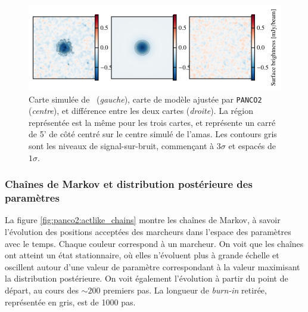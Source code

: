 \begin{figure}[t]
    \centering
    \includegraphics[width=\linewidth]{Figures/Chap_panco/demo_plots/data_model_residuals.pdf}
    \caption{
        Carte simulée de \act\ (\textit{gauche}), carte de modèle ajustée par \texttt{PANCO2} (\textit{centre}), et différence entre les deux cartes (\textit{droite}).
        La région représentée est la même pour les trois cartes, et représente un carré de 5' de côté centré sur le centre simulé de l'amas.
        Les contours gris sont les niveaux de signal-sur-bruit, commençant à $3\sigma$ et espacés de $1\sigma$.
    }
    \label{fig:panco2:actlike_dmr}
\end{figure}

\subsubsection{Chaînes de Markov et distribution postérieure des paramètres} %
La figure \ref{fig:panco2:actlike_chains} montre les chaînes de Markov, à savoir l'évolution des positions acceptées des marcheurs dans l'espace des paramètres avec le temps.
Chaque couleur correspond à un marcheur.
On voit que les chaînes ont atteint un état stationnaire, où elles n'évoluent plus à grande échelle et oscillent autour d'une valeur de paramètre correspondant à la valeur maximisant la distribution postérieure.
On voit également l'évolution à partir du point de départ, au cours des $\sim 200$ premiers pas.
La longueur de \textit{burn-in} retirée, représentée en gris, est de 1000 pas.

